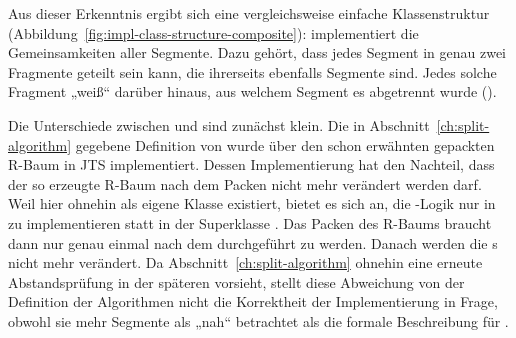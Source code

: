 \documentclass[../main/thesis.tex]{subfiles}
\begin{document}
Aus dieser Erkenntnis ergibt sich eine vergleichsweise einfache Klassenstruktur (Abbildung~\ref{fig:impl-class-structure-composite}):
 implementiert die Gemeinsamkeiten aller Segmente.
Dazu gehört, dass jedes Segment in genau zwei Fragmente geteilt sein kann, die ihrerseits ebenfalls Segmente sind.
Jedes solche Fragment „weiß“ darüber hinaus, aus welchem Segment es abgetrennt wurde ().



Die Unterschiede zwischen  und  sind zunächst klein.
Die in Abschnitt~\ref{ch:split-algorithm} gegebene Definition von  wurde über den schon erwähnten gepackten R-Baum in JTS implementiert.
Dessen Implementierung hat den Nachteil, dass der so erzeugte R-Baum nach dem Packen nicht mehr verändert werden darf.
Weil hier ohnehin  als eigene Klasse existiert, bietet es sich an, die -Logik nur in  zu implementieren statt in der Superklasse .
Das Packen des R-Baums braucht dann nur genau einmal nach dem  durchgeführt zu werden.
Danach werden die s nicht mehr verändert.
Da Abschnitt~\ref{ch:split-algorithm} ohnehin eine erneute Abstandsprüfung in der späteren  vorsieht, stellt diese Abweichung von der Definition der Algorithmen nicht die Korrektheit der Implementierung in Frage, obwohl sie mehr Segmente als „nah“ betrachtet als die formale Beschreibung für .


\end{document}
